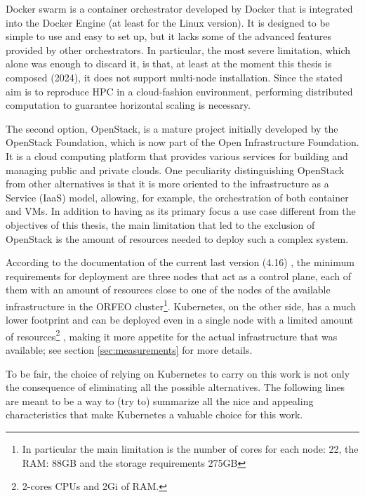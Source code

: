 Docker swarm \cite{Singh2023} is a container orchestrator developed by Docker
that is integrated into the Docker Engine (at least for the Linux version).
It is designed to be simple to use and easy to set up, but it lacks some of the
advanced features provided by other orchestrators.
In particular, the most severe limitation, which alone was enough to discard it,
is that, at least at the moment this thesis is composed (2024), it does not
support multi-node installation. Since the stated aim is to reproduce HPC in a
cloud-fashion environment, performing distributed computation to guarantee
horizontal scaling is necessary.

The second option, OpenStack, is a mature project initially developed by the
OpenStack Foundation, which is now part of the Open Infrastructure Foundation.
It is a cloud computing platform that provides various services for building and
managing public and private clouds.
One peculiarity distinguishing OpenStack from other alternatives is that it is
more oriented to the infrastructure as a Service (IaaS) model, allowing, for
example, the orchestration of both container and VMs.
In addition to having as its primary focus a use case different from the
objectives of this thesis, the main limitation that led to the exclusion of
OpenStack is the amount of resources needed to deploy such a complex system.

According to the documentation of the current last version (4.16)
\cite{openstakinstallationdoc}, the minimum requirements for deployment are
three nodes that act as a control plane, each of them with an amount of
resources close to one of the nodes of the available infrastructure in the ORFEO
cluster\footnote{In particular the main limitation is the number of cores for
  each node: 22, the RAM: 88GB and the storage requirements 275GB}.
Kubernetes, on the other side, has a much lower footprint and can be deployed
even in a single node with a limited amount of resources\footnote{2-cores CPUs
  and 2Gi of RAM.} \cite{kdoc-installation}, making it more appetite for the
actual infrastructure that was available; see section \ref{sec:measurements} for
more details.

To be fair, the choice of relying on Kubernetes to carry on this work is not
only the consequence of eliminating all the possible alternatives.
The following lines are meant to be a way to (try to) summarize all the nice and
appealing characteristics that make Kubernetes a valuable choice for this work.


